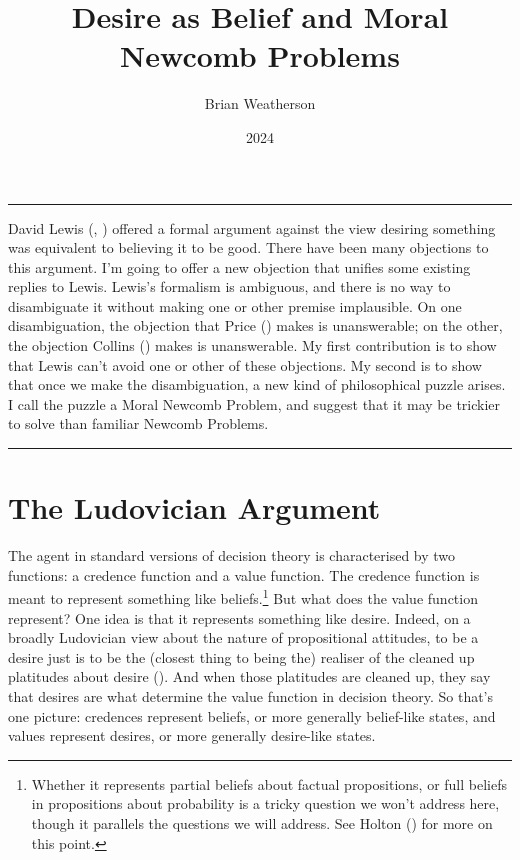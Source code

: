 \documentclass[
  10pt,
  letterpaper,
  DIV=11,
  numbers=noendperiod,
  twoside]{scrartcl}
\title{Desire as Belief and Moral Newcomb Problems}
\author{Brian Weatherson}
\date{2024}
\renewenvironment{abstract}
 {\vspace{-1.25cm}
 \quotation\small\noindent\rule{\linewidth}{.5pt}\par\smallskip
 \noindent }
 {\par\noindent\rule{\linewidth}{.5pt}\endquotation}
\begin{document}
\maketitle
\begin{abstract}
David Lewis (,
) offered a formal argument against the
view desiring something was equivalent to believing it to be good. There
have been many objections to this argument. I'm going to offer a new
objection that unifies some existing replies to Lewis. Lewis's formalism
is ambiguous, and there is no way to disambiguate it without making one
or other premise implausible. On one disambiguation, the objection that
Price () makes is unanswerable; on the
other, the objection Collins () makes is
unanswerable. My first contribution is to show that Lewis can't avoid
one or other of these objections. My second is to show that once we make
the disambiguation, a new kind of philosophical puzzle arises. I call
the puzzle a Moral Newcomb Problem, and suggest that it may be trickier
to solve than familiar Newcomb Problems.
\end{abstract}

\section{The Ludovician Argument}\label{the-ludovician-argument}

The agent in standard versions of decision theory is characterised by
two functions: a credence function and a value function. The credence
function is meant to represent something like beliefs.\footnote{Whether
  it represents partial beliefs about factual propositions, or full
  beliefs in propositions about probability is a tricky question we
  won't address here, though it parallels the questions we will address.
  See Holton () for more on this point.}
But what does the value function represent? One idea is that it
represents something like desire. Indeed, on a broadly Ludovician view
about the nature of propositional attitudes, to be a desire just is to
be the (closest thing to being the) realiser of the cleaned up
platitudes about desire (). And
when those platitudes are cleaned up, they say that desires are what
determine the value function in decision theory. So that's one picture:
credences represent beliefs, or more generally belief-like states, and
values represent desires, or more generally desire-like states.
\end{document}
